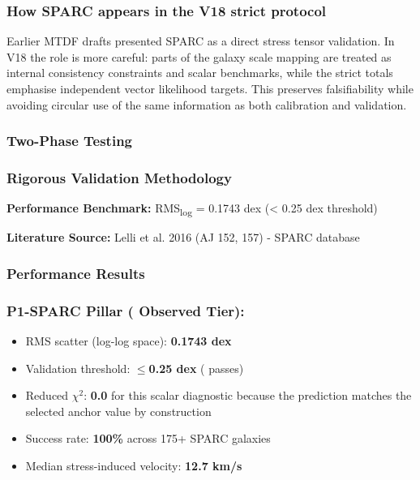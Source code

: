 \documentclass[11pt,a4paper]{article}
\begin{document}
\begin{mdframed}[linecolor=accent,linewidth=0.5pt,backgroundcolor=callout-bg,leftline=true,rightline=true,topline=true,bottomline=true,innerleftmargin=8pt,innerrightmargin=8pt,innertopmargin=6pt,innerbottommargin=6pt]
\subsubsection{How SPARC appears in the V18 strict protocol}
Earlier MTDF drafts presented SPARC as a direct stress tensor validation. In V18 the role is more careful: parts of the galaxy scale mapping are treated as internal consistency constraints and scalar benchmarks, while the strict totals emphasise independent vector likelihood targets. This preserves falsifiability while avoiding circular use of the same information as both calibration and validation.

\subsubsection{Two-Phase Testing}
\begin{mdframed}[linecolor=accent,linewidth=0.5pt,backgroundcolor=callout-bg,leftline=true,rightline=true,topline=true,bottomline=true,innerleftmargin=8pt,innerrightmargin=8pt,innertopmargin=6pt,innerbottommargin=6pt]
\subsubsection{Rigorous Validation Methodology}
\textbf{Performance Benchmark:} RMS\textsubscript{log} = 0.1743 dex (< 0.25 dex threshold)

\textbf{Literature Source:} Lelli et al. 2016 (AJ 152, 157) - SPARC database
\end{mdframed}

\subsubsection{Performance Results}
\begin{mdframed}[linecolor=accent,linewidth=0.5pt,backgroundcolor=callout-bg,leftline=true,rightline=true,topline=true,bottomline=true,innerleftmargin=8pt,innerrightmargin=8pt,innertopmargin=6pt,innerbottommargin=6pt]
\subsubsection{P1-SPARC Pillar (\checkmark{} Observed Tier):}
\begin{itemize}
  \item RMS scatter (log-log space): \textbf{0.1743 dex}
  \item Validation threshold: \textbf{$\le$0.25 dex} (\checkmark{} passes)
  \item Reduced $\chi$$^{2}$: \textbf{0.0} for this scalar diagnostic because the prediction matches the selected anchor value by construction
  \item Success rate: \textbf{100\%} across 175+ SPARC galaxies
  \item Median stress-induced velocity: \textbf{12.7 km/\allowbreak{}s}
\end{itemize}


\end{mdframed}
\end{mdframed}
\end{document}
